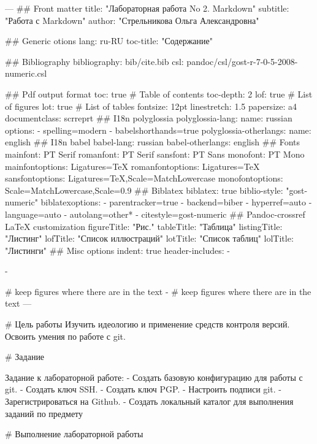 ---
## Front matter
title: "Лабораторная работа No 2.  Markdown"
subtitle: "Работа с Markdown"
author: "Стрельникова Ольга Александровна"

## Generic otions
lang: ru-RU
toc-title: "Содержание"

## Bibliography
bibliography: bib/cite.bib
csl: pandoc/csl/gost-r-7-0-5-2008-numeric.csl

## Pdf output format
toc: true # Table of contents
toc-depth: 2
lof: true # List of figures
lot: true # List of tables
fontsize: 12pt
linestretch: 1.5
papersize: a4
documentclass: scrreprt
## I18n polyglossia
polyglossia-lang:
  name: russian
  options:
	- spelling=modern
	- babelshorthands=true
polyglossia-otherlangs:
  name: english
## I18n babel
babel-lang: russian
babel-otherlangs: english
## Fonts
mainfont: PT Serif
romanfont: PT Serif
sansfont: PT Sans
monofont: PT Mono
mainfontoptions: Ligatures=TeX
romanfontoptions: Ligatures=TeX
sansfontoptions: Ligatures=TeX,Scale=MatchLowercase
monofontoptions: Scale=MatchLowercase,Scale=0.9
## Biblatex
biblatex: true
biblio-style: "gost-numeric"
biblatexoptions:
  - parentracker=true
  - backend=biber
  - hyperref=auto
  - language=auto
  - autolang=other*
  - citestyle=gost-numeric
## Pandoc-crossref LaTeX customization
figureTitle: "Рис."
tableTitle: "Таблица"
listingTitle: "Листинг"
lofTitle: "Список иллюстраций"
lotTitle: "Список таблиц"
lolTitle: "Листинги"
## Misc options
indent: true
header-includes:
  - \usepackage{indentfirst}
  - \usepackage{float} # keep figures where there are in the text
  -  # keep figures where there are in the text
---

# Цель работы
Изучить идеологию и применение средств контроля версий. Освоить умения по работе с git.

# Задание

Задание к лабораторной работе:
- Создать базовую конфигурацию для работы с git.
- Создать ключ SSH.
- Создать ключ PGP.
- Настроить подписи git.
- Зарегистрироваться на Github.
- Создать локальный каталог для выполнения заданий по предмету

# Выполнение лабораторной работы

